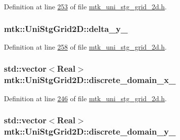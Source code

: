 Definition at line \hyperlink{mtk__uni__stg__grid__2d_8h_source_l00253}{253} of file \hyperlink{mtk__uni__stg__grid__2d_8h_source}{mtk\-\_\-uni\-\_\-stg\-\_\-grid\-\_\-2d.\-h}.

\hypertarget{classmtk_1_1UniStgGrid2D_ace5af3c991f241a895318b9761db73eb}{
\subsubsection[{delta\-\_\-y\-\_\-}]{ mtk\-::\-Uni\-Stg\-Grid2\-D\-::delta\-\_\-y\-\_\-\hspace{0.3cm}{\ttfamily [private]}}}\label{classmtk_1_1UniStgGrid2D_ace5af3c991f241a895318b9761db73eb}


Definition at line \hyperlink{mtk__uni__stg__grid__2d_8h_source_l00258}{258} of file \hyperlink{mtk__uni__stg__grid__2d_8h_source}{mtk\-\_\-uni\-\_\-stg\-\_\-grid\-\_\-2d.\-h}.

\hypertarget{classmtk_1_1UniStgGrid2D_ab15979865852583a46662ea592f27a4f}{
\subsubsection[{discrete\-\_\-domain\-\_\-x\-\_\-}]{\setlength{\rightskip}{0pt plus 5cm}std\-::vector$<${\bf Real}$>$ mtk\-::\-Uni\-Stg\-Grid2\-D\-::discrete\-\_\-domain\-\_\-x\-\_\-\hspace{0.3cm}{\ttfamily [private]}}}\label{classmtk_1_1UniStgGrid2D_ab15979865852583a46662ea592f27a4f}


Definition at line \hyperlink{mtk__uni__stg__grid__2d_8h_source_l00246}{246} of file \hyperlink{mtk__uni__stg__grid__2d_8h_source}{mtk\-\_\-uni\-\_\-stg\-\_\-grid\-\_\-2d.\-h}.

\hypertarget{classmtk_1_1UniStgGrid2D_ad69f93d4b27707d97f209b907383a7a2}{
\subsubsection[{discrete\-\_\-domain\-\_\-y\-\_\-}]{\setlength{\rightskip}{0pt plus 5cm}std\-::vector$<${\bf Real}$>$ mtk\-::\-Uni\-Stg\-Grid2\-D\-::discrete\-\_\-domain\-\_\-y\-\_\-\hspace{0.3cm}{\ttfamily [private]}}}\label{classmtk_1_1UniStgGrid2D_ad69f93d4b27707d97f209b907383a7a2}


